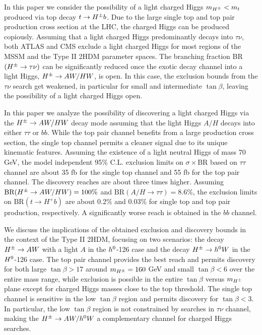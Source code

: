  


In this paper we consider the possibility of a light charged Higgs $m_{H^{\pm}} < m_t$ produced via top decay $t \to H^{\pm} b$. Due to the large single top and top pair production cross section at the LHC, the charged Higgs can be  produced copiously. Assuming that a light charged Higgs predominantly decays into $\tau\nu$, both ATLAS and CMS exclude a light charged Higgs for most  regions  of the  MSSM and the Type II 2HDM  parameter spaces. The branching fraction BR$(H^{\pm} \to \tau\nu)$ can be significantly reduced once the exotic decay channel into a light Higgs, $H^{\pm} \to AW/HW$, is open.   In this case, the exclusion bounds from the $\tau\nu$ search get weakened,   in particular for small and intermediate $\tan \beta$,   leaving the possibility of a light charged Higgs open. 

In this paper we analyze the possibility of discovering a light charged Higgs via the $H^{\pm} \to AW/HW$ decay mode assuming that the light Higgs $A/H$ decays into either $\tau\tau$ or $bb$. While the top pair channel benefits from a large production cross section, the single top channel permits a cleaner signal due to its unique kinematic features. Assuming the existence of a light neutral Higgs of mass 70 GeV, the model independent  95\% C.L. exclusion limits on $\sigma\times$BR based on $\tau\tau$ channel  are about 35 fb for the single top channel and 55 fb for the top pair channel. The discovery reaches are about three times higher.   Assuming $\text{BR}(H^{\pm} \rightarrow AW/HW)=100\%$ and $\text{BR}(A/H \rightarrow \tau\tau)=8.6\%$,  the exclusion limits on $\text{BR}(t \rightarrow H^+ b)$ are about 0.2\% and 0.03\% for single top and top pair production, respectively.  A significantly worse reach is obtained in the $bb$ channel. 

We discuss the implications of the obtained exclusion and discovery bounds in the context of the Type II 2HDM, focusing on two scenarios: the decay $H^{\pm} \to AW$ with a light $A$ in the $h^0$-126 case and the decay $H^{\pm} \to h^0 W$ in the $H^0$-126 case.     The top pair channel provides the best reach and permits discovery for both large $\tan\beta>17$ around $m_{H^{\pm}}=160$ GeV and small $\tan\beta<6$ over the entire mass range, while exclusion is possible in the entire $\tan\beta$ versus $m_{H^{\pm}}$ plane except for charged Higgs masses close to the top threshold. The single top channel is sensitive in the low $\tan\beta$ region and permits discovery for $\tan\beta< 3$. In particular, the low $\tan\beta$ region is not constrained by searches in $\tau\nu$ channel, making the $H^{\pm} \to AW/h^0 W$ a complementary channel for charged Higgs searches.

